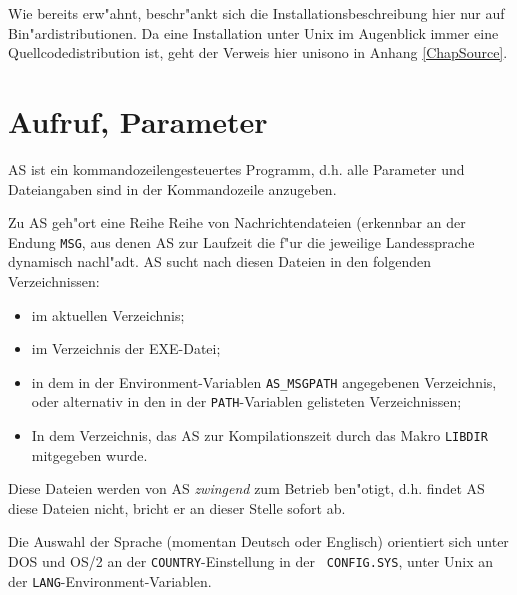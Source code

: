 \documentclass[12pt,a4paper,twoside]{report}
\begin{document}
Wie bereits erw"ahnt, beschr"ankt sich die Installationsbeschreibung hier
nur auf Bin"ardistributionen.  Da eine Installation unter Unix
 im Augenblick immer eine Quellcodedistribution ist, 
geht der Verweis hier unisono in Anhang \ref{ChapSource}.


\section{Aufruf, Parameter}\label{SectCallConvention}

AS ist ein kommandozeilengesteuertes Programm, d.h. alle Parameter
und Dateiangaben sind in der Kommandozeile anzugeben.  

Zu AS geh"ort eine Reihe Reihe von Nachrichtendateien (erkennbar an der
Endung {\tt MSG}, aus denen AS zur Laufzeit die f"ur die jeweilige
Landessprache dynamisch nachl"adt.  AS sucht nach diesen Dateien in den
folgenden Verzeichnissen:
\begin{itemize}
\item{im aktuellen Verzeichnis;}
\item{im Verzeichnis der EXE-Datei;}
\item{in dem in der Environment-Variablen {\tt AS\_MSGPATH} angegebenen
      Verzeichnis, oder alternativ in den in der {\tt PATH}-Variablen
      gelisteten Verzeichnissen;}
\item{In dem Verzeichnis, das AS zur Kompilationszeit durch das 
      Makro {\tt LIBDIR} mitgegeben wurde.}
\end{itemize}
Diese Dateien werden von AS {\em zwingend} zum Betrieb ben"otigt, d.h.
findet AS diese Dateien nicht, bricht er an dieser Stelle sofort ab.

Die Auswahl der Sprache (momentan Deutsch oder Englisch) orientiert sich
unter DOS und OS/2 an der {\tt COUNTRY}-Einstellung in der {\tt
CONFIG.SYS}, unter Unix an der {\tt LANG}-Environment-Variablen.
\end{document}
